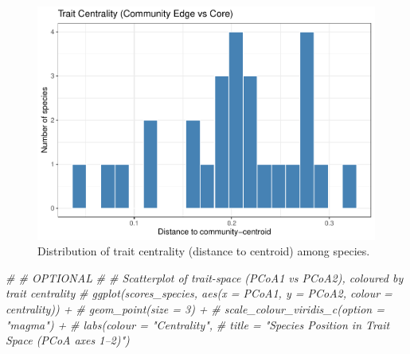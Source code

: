 \documentclass[
]{article}
\newenvironment{Shaded}{\begin{snugshade}}{\end{snugshade}}
\newcommand{\CommentTok}[1]{\textcolor[rgb]{0.56,0.35,0.01}{\textit{#1}}}
\begin{document}
\begin{figure}
\includegraphics[width=1\linewidth]{man/figures/README-trait-centrality-1} \caption{Distribution of trait centrality (distance to centroid) among species.}\label{fig:trait-centrality}
\end{figure}

\begin{Shaded}
\begin{Highlighting}[]

\CommentTok{\# \# OPTIONAL}
\CommentTok{\# \# Scatterplot of trait{-}space (PCoA1 vs PCoA2), coloured by trait centrality}
\CommentTok{\# ggplot(scores\_species, aes(x = PCoA1, y = PCoA2, colour = centrality)) +}
\CommentTok{\#   geom\_point(size = 3) +}
\CommentTok{\#   scale\_colour\_viridis\_c(option = "magma") +}
\CommentTok{\#   labs(colour = "Centrality",}
\CommentTok{\#        title = "Species Position in Trait Space (PCoA axes 1–2)")}
\end{Highlighting}
\end{Shaded}
\end{document}
